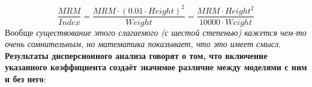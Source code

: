\documentclass[
]{article}
\newenvironment{Shaded}{\begin{snugshade}}{\end{snugshade}}
\newcommand{\DataTypeTok}[1]{\textcolor[rgb]{0.13,0.29,0.53}{#1}}
\newcommand{\DecValTok}[1]{\textcolor[rgb]{0.00,0.00,0.81}{#1}}
\newcommand{\KeywordTok}[1]{\textcolor[rgb]{0.13,0.29,0.53}{\textbf{#1}}}
\newcommand{\NormalTok}[1]{#1}
\newcommand{\OperatorTok}[1]{\textcolor[rgb]{0.81,0.36,0.00}{\textbf{#1}}}
\newcommand{\StringTok}[1]{\textcolor[rgb]{0.31,0.60,0.02}{#1}}
\begin{document}
\[\frac{MRM}{Index}=\frac{MRM \cdot (0.01 \cdot Height)^2}{Weight}=\frac{MRM \cdot Height^2}{10000\cdot Weight}\]
Вообще \emph{существование этого слагаемого (с шестой степенью) кажется
чем-то очень сомнительным, но математика показывает, что это имеет
смысл}. \textbf{Результаты дисперсионного анализа говорят о том, что
включение указанного коэффициента создаёт значимое различие между
моделями с ним и без него}:

\begin{Shaded}
\end{Shaded}
\end{document}
